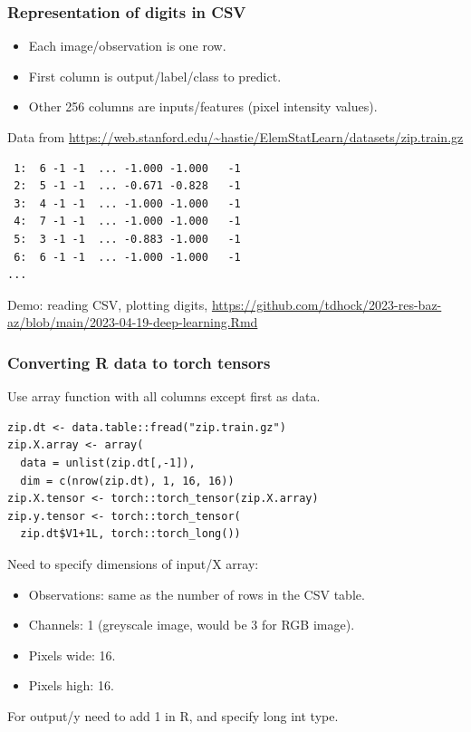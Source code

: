 \documentclass{beamer}
\begin{document}
\begin{frame}[fragile]
  \frametitle{Representation of digits in CSV}

  \begin{itemize}
  \item Each image/observation is one row.
  \item First column is output/label/class to predict.
  \item Other 256 columns are inputs/features (pixel intensity
    values).
  \end{itemize}
 Data from {\scriptsize \url{https://web.stanford.edu/~hastie/ElemStatLearn/datasets/zip.train.gz}}

\begin{verbatim}
 1:  6 -1 -1  ... -1.000 -1.000   -1
 2:  5 -1 -1  ... -0.671 -0.828   -1
 3:  4 -1 -1  ... -1.000 -1.000   -1
 4:  7 -1 -1  ... -1.000 -1.000   -1
 5:  3 -1 -1  ... -0.883 -1.000   -1
 6:  6 -1 -1  ... -1.000 -1.000   -1
...
\end{verbatim}

Demo: reading CSV, plotting digits, \url{https://github.com/tdhock/2023-res-baz-az/blob/main/2023-04-19-deep-learning.Rmd}
  
\end{frame}

\begin{frame}[fragile]
  \frametitle{Converting R data to torch tensors}
Use array function with all columns except first as data.  
\begin{verbatim}
zip.dt <- data.table::fread("zip.train.gz")
zip.X.array <- array(
  data = unlist(zip.dt[,-1]),
  dim = c(nrow(zip.dt), 1, 16, 16))
zip.X.tensor <- torch::torch_tensor(zip.X.array)
zip.y.tensor <- torch::torch_tensor(
  zip.dt$V1+1L, torch::torch_long())
\end{verbatim}
Need to specify dimensions of input/X array:
\begin{itemize}
\item Observations: same as the number of rows in the CSV table.
\item Channels: 1 (greyscale image, would be 3 for RGB image).
\item Pixels wide: 16.
\item Pixels high: 16.
\end{itemize}

For output/y need to add 1 in R, and specify long int type.

\end{frame}
\end{document}
